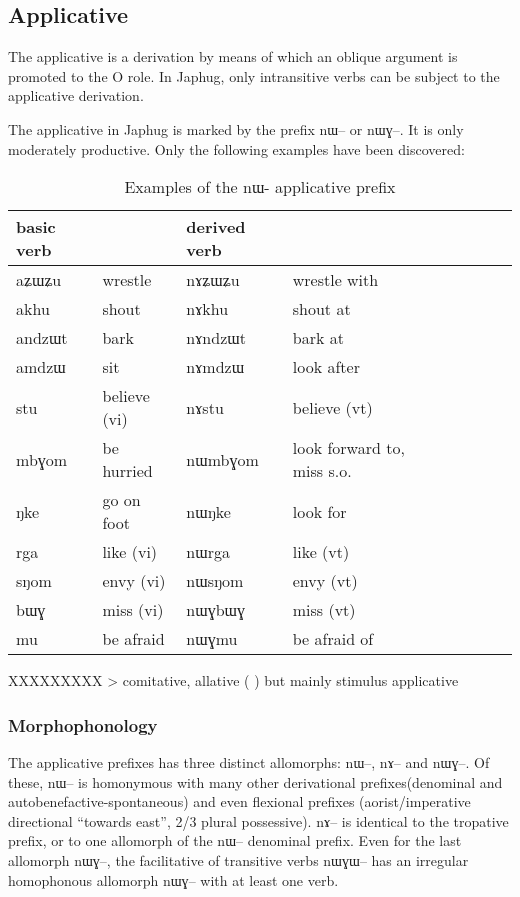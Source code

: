 \documentclass[oldfontcommands,oneside,a4paper,11pt]{memoir}
\newcommand{\ipa}[1]{{\phon #1}} %
\begin{document}
 



\subsection{Applicative} \label{sub:applicative}
The applicative is a derivation by means of which an oblique argument is promoted to the O role. In Japhug, only intransitive verbs can be subject to the applicative derivation. 

The applicative in Japhug is marked by the prefix \ipa{nɯ}-- or \ipa{nɯɣ}--. It is only moderately productive. Only the following  examples have been discovered:

\begin{table}[H]
\caption{Examples of the \ipa{nɯ}- applicative prefix}\label{tab:applicative}
\begin{tabular}{lllllllll} \toprule
basic verb  & &derived  verb &\\
\midrule
 \ipa{aʑɯʑu}  & wrestle	& \ipa{nɤʑɯʑu}  & wrestle with\\
\ipa{akhu}  &	shout&\ipa{nɤkhu}  & shout at \\
\ipa{andzɯt}  &	bark&\ipa{nɤndzɯt}  & bark at \\
\ipa{amdzɯ}  &sit & \ipa{nɤmdzɯ}  &look after\\
    \ipa{stu}  &believe (vi)	& \ipa{nɤstu}  & believe (vt)\\
\midrule
\ipa{mbɣom}  &	be hurried & \ipa{nɯmbɣom}  & look  forward to, miss s.o.\\
\ipa{ŋke}  &go on foot	& \ipa{nɯŋke}  & look for \\
\ipa{rga}  &	like (vi) & \ipa{nɯrga}  &like (vt) \\
\ipa{sŋom}  &	envy (vi) & \ipa{nɯsŋom}  &envy (vt) \\
\midrule
  \ipa{bɯɣ}  &miss (vi)	& \ipa{nɯɣbɯɣ}  & miss (vt)\\
  \ipa{mu} & be afraid & \ipa{nɯɣmu} & be afraid of \\
\bottomrule
\end{tabular}
\end{table}

XXXXXXXXX \citet{peterson07appl}
> comitative, allative ( \citet{peterson07appl}) but mainly  stimulus applicative
\subsubsection{Morphophonology}
The applicative prefixes has three distinct allomorphs: \ipa{nɯ}--, \ipa{nɤ}-- and \ipa{nɯɣ}--. Of these, \ipa{nɯ}-- is homonymous with many other derivational prefixes(denominal and autobenefactive-spontaneous) and even flexional prefixes (aorist/imperative directional ``towards east'', 2/3 plural possessive). \ipa{nɤ}-- is identical to the tropative prefix, or to one allomorph of the \ipa{nɯ}-- denominal prefix. Even for the last allomorph \ipa{nɯɣ}--, the facilitative of transitive verbs \ipa{nɯɣɯ}-- has an irregular homophonous allomorph \ipa{nɯɣ}-- with at least one verb. 
\end{document}
